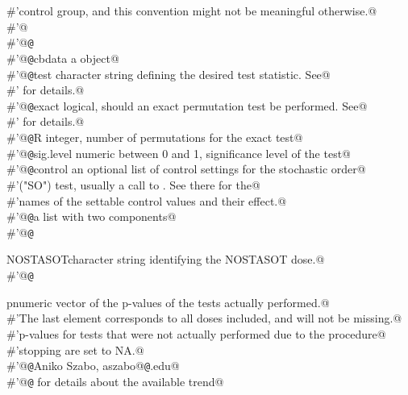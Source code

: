 \documentclass[reqno]{amsart}
\begin{document}
\begin{flushleft}
\begin{list}{}{}
\mbox{}\verb@#'control group, and this convention might not be meaningful otherwise.@\\
\mbox{}\verb@#'@\\
\mbox{}\verb@#'@{\tt @}\verb@export@\\
\mbox{}\verb@#'@{\tt @}\verb@param cbdata a  object@\\
\mbox{}\verb@#'@{\tt @}\verb@param test character string defining the desired test statistic. See@\\
\mbox{}\verb@#' for details.@\\
\mbox{}\verb@#'@{\tt @}\verb@param exact logical, should an exact permutation test be performed. See@\\
\mbox{}\verb@#' for details.@\\
\mbox{}\verb@#'@{\tt @}\verb@param R integer, number of permutations for the exact test@\\
\mbox{}\verb@#'@{\tt @}\verb@param sig.level numeric between 0 and 1, significance level of the test@\\
\mbox{}\verb@#'@{\tt @}\verb@param control an optional list of control settings for the stochastic order@\\
\mbox{}\verb@#'("SO") test, usually a call to .  See there for the@\\
\mbox{}\verb@#'names of the settable control values and their effect.@\\
\mbox{}\verb@#'@{\tt @}\verb@return a list with two components@\\
\mbox{}\verb@#'@{\tt @}\verb@return \item{NOSTASOT}{character string identifying the NOSTASOT dose.}@\\
\mbox{}\verb@#'@{\tt @}\verb@return \item{p}{numeric vector of the p-values of the tests actually performed.}@\\
\mbox{}\verb@#'The last element corresponds to all doses included, and will not be missing.@\\
\mbox{}\verb@#'p-values for tests that were not actually performed due to the procedure@\\
\mbox{}\verb@#'stopping are set to NA.@\\
\mbox{}\verb@#'@{\tt @}\verb@author Aniko Szabo, aszabo@{\tt @}\verb@mcw.edu@\\
\mbox{}\verb@#'@{\tt @}\verb@seealso {} for details about the available trend@\\

\end{list}
\end{flushleft}
\end{document}
